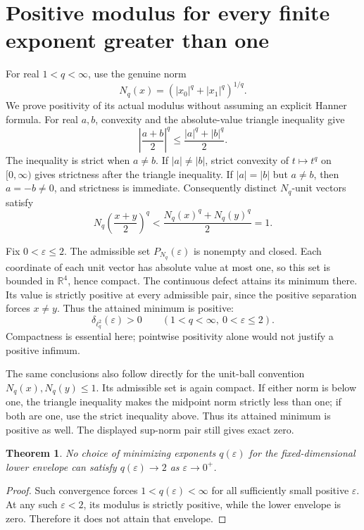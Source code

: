 \documentclass[11pt]{article}
\newtheorem{theorem}{Theorem}
\begin{document}
\section*{Positive modulus for every finite exponent greater than one}
For real $1<q<\infty$, use the genuine norm
\[
 N_q(x)=\left(|x_0|^q+|x_1|^q\right)^{1/q}.
\]
We prove positivity of its actual modulus without
assuming an explicit Hanner formula.
For real $a,b$, convexity and the absolute-value triangle
inequality give
\[
 \left|\frac{a+b}{2}\right|^q
 \leq\frac{|a|^q+|b|^q}{2}.
\]
The inequality is strict when $a\ne b$. If $|a|\ne|b|$,
strict convexity of $t\mapsto t^q$ on $[0,\infty)$ gives
strictness after the triangle inequality. If $|a|=|b|$
but $a\ne b$, then $a=-b\ne0$, and strictness is immediate.
Consequently distinct $N_q$-unit vectors satisfy
\[
 N_q\left(\frac{x+y}{2}\right)^q
 <\frac{N_q(x)^q+N_q(y)^q}{2}=1.
\]

Fix $0<\varepsilon\leq2$. The admissible set
$P_{N_q}(\varepsilon)$ is nonempty and closed.
Each coordinate of each unit vector has absolute value
at most one, so this set is bounded in $\mathbb R^4$,
hence compact. The continuous defect attains its
minimum there. Its value is strictly positive at every
admissible pair, since the positive separation forces
$x\ne y$. Thus the attained minimum is positive:
\[
 \delta_{\ell_q^2}(\varepsilon)>0
 \qquad(1<q<\infty,\ 0<\varepsilon\leq2).
\]
Compactness is essential here; pointwise positivity
alone would not justify a positive infimum.

The same conclusions also follow directly for the
unit-ball convention $N_q(x),N_q(y)\leq1$. Its admissible
set is again compact. If either norm is below one, the
triangle inequality makes the midpoint norm strictly
less than one; if both are one, use the strict inequality
above. Thus its attained minimum is positive as well.
The displayed sup-norm pair still gives exact zero.

\begin{theorem}
No choice of minimizing exponents $q(\varepsilon)$
for the fixed-dimensional lower envelope can satisfy
$q(\varepsilon)\to2$ as $\varepsilon\to0^+$.
\end{theorem}
\begin{proof}
Such convergence forces $1<q(\varepsilon)<\infty$ for
all sufficiently small positive $\varepsilon$.
At any such $\varepsilon<2$, its modulus is strictly
positive, while the lower envelope is zero. Therefore
it does not attain that envelope.
\end{proof}
\end{document}
